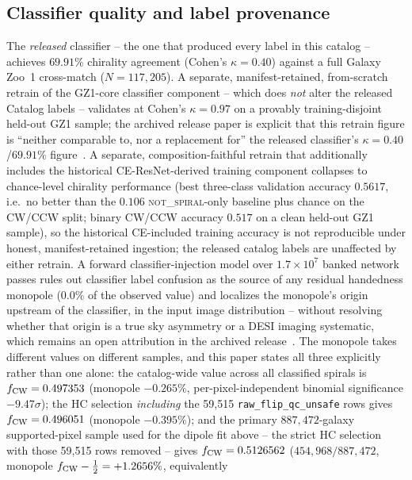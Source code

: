 \documentclass[twocolumn,linenumbers]{aastex702}
\newcommand{\NS}{\textsc{not\_spiral}}
\newcommand{\sigmaunit}{\sigma}
\begin{document}
\subsection{Classifier quality and label provenance}
\label{sec:catalog_classifier}

The \emph{released} classifier -- the one that produced every label in this
catalog -- achieves $69.91\%$ chirality agreement (Cohen's $\kappa=0.40$)
against a full Galaxy Zoo~1 cross-match ($N=117{,}205$). A separate,
manifest-retained, from-scratch retrain of the GZ1-core classifier
component -- which does \emph{not} alter the released Catalog labels --
validates at Cohen's $\kappa=0.97$ on a provably training-disjoint held-out
GZ1 sample; the archived release paper is explicit that this retrain
figure is ``neither comparable to, nor a replacement for'' the released
classifier's $\kappa=0.40$/$69.91\%$ figure~\cite{Golden:P4v274}. A separate,
composition-faithful retrain that additionally includes the historical
CE-ResNet-derived training component collapses to chance-level chirality
performance (best three-class validation accuracy $0.5617$, i.e.\ no better
than the $0.106$ \NS-only baseline plus chance on the CW/CCW split; binary
CW/CCW accuracy $0.517$ on a clean held-out GZ1 sample), so the historical
CE-included training accuracy is not reproducible under honest,
manifest-retained ingestion; the released catalog labels are unaffected by
either retrain. A forward classifier-injection model over
$1.7\times10^{7}$ banked network passes rules out classifier label
confusion as the source of any residual handedness monopole ($0.0\%$ of the
observed value) and localizes the monopole's origin upstream of the
classifier, in the input image distribution -- without resolving whether
that origin is a true sky asymmetry or a DESI imaging systematic, which
remains an open attribution in the archived release~\cite{Golden:P4v274}.
The monopole takes different values on different samples, and this paper
states all three explicitly rather than one alone: the catalog-wide value
across all classified spirals is $f_{\rm CW}=0.497353$ (monopole
$-0.265\%$, per-pixel-independent binomial significance $-9.47\sigmaunit$);
the HC selection \emph{including} the 59,515
\texttt{raw\_flip\_qc\_unsafe} rows gives $f_{\rm CW}=0.496051$
(monopole $-0.395\%$); and the primary $887{,}472$-galaxy supported-pixel
sample used for the dipole fit above -- the strict HC selection with those
59,515 rows removed -- gives $f_{\rm CW}=0.5126562$
($454{,}968/887{,}472$, monopole $f_{\rm CW}-\tfrac12=+1.2656\%$, equivalently
\end{document}

